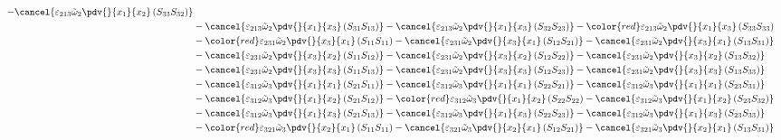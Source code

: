\begin{equation}
\begin{split}
		-\cancel{\varepsilon_{213}\tilde{\omega}_{2}\pdv{}{x_{1}}{x_{2}}\left(S_{33}S_{32}\right)}\\
&		-\cancel{\varepsilon_{213}\tilde{\omega}_{2}\pdv{}{x_{1}}{x_{3}}\left(S_{31}S_{13}\right)}
		-\cancel{\varepsilon_{213}\tilde{\omega}_{2}\pdv{}{x_{1}}{x_{3}}\left(S_{32}S_{23}\right)}
		-{\color{red}\varepsilon_{213}\tilde{\omega}_{2}\pdv{}{x_{1}}{x_{3}}\left(S_{33}S_{33}\right)}\\
&		-{\color{red}\varepsilon_{231}\tilde{\omega}_{2}\pdv{}{x_{3}}{x_{1}}\left(S_{11}S_{11}\right)}
		-\cancel{\varepsilon_{231}\tilde{\omega}_{2}\pdv{}{x_{3}}{x_{1}}\left(S_{12}S_{21}\right)}
		-\cancel{\varepsilon_{231}\tilde{\omega}_{2}\pdv{}{x_{3}}{x_{1}}\left(S_{13}S_{31}\right)}\\
&		-\cancel{\varepsilon_{231}\tilde{\omega}_{2}\pdv{}{x_{3}}{x_{2}}\left(S_{11}S_{12}\right)}
		-\cancel{\varepsilon_{231}\tilde{\omega}_{2}\pdv{}{x_{3}}{x_{2}}\left(S_{12}S_{22}\right)}
		-\cancel{\varepsilon_{231}\tilde{\omega}_{2}\pdv{}{x_{3}}{x_{2}}\left(S_{13}S_{32}\right)}\\
&		-\cancel{\varepsilon_{231}\tilde{\omega}_{2}\pdv{}{x_{3}}{x_{3}}\left(S_{11}S_{13}\right)}
		-\cancel{\varepsilon_{231}\tilde{\omega}_{2}\pdv{}{x_{3}}{x_{3}}\left(S_{12}S_{23}\right)}
		-\cancel{\varepsilon_{231}\tilde{\omega}_{2}\pdv{}{x_{3}}{x_{3}}\left(S_{13}S_{33}\right)}\\
&		-\cancel{\varepsilon_{312}\tilde{\omega}_{3}\pdv{}{x_{1}}{x_{1}}\left(S_{21}S_{11}\right)}
		-\cancel{\varepsilon_{312}\tilde{\omega}_{3}\pdv{}{x_{1}}{x_{1}}\left(S_{22}S_{21}\right)}
		-\cancel{\varepsilon_{312}\tilde{\omega}_{3}\pdv{}{x_{1}}{x_{1}}\left(S_{23}S_{31}\right)}\\
&		-\cancel{\varepsilon_{312}\tilde{\omega}_{3}\pdv{}{x_{1}}{x_{2}}\left(S_{21}S_{12}\right)}
		-{\color{red}\varepsilon_{312}\tilde{\omega}_{3}\pdv{}{x_{1}}{x_{2}}\left(S_{22}S_{22}\right)}
		-\cancel{\varepsilon_{312}\tilde{\omega}_{3}\pdv{}{x_{1}}{x_{2}}\left(S_{23}S_{32}\right)}\\
&		-\cancel{\varepsilon_{312}\tilde{\omega}_{3}\pdv{}{x_{1}}{x_{3}}\left(S_{21}S_{13}\right)}
		-\cancel{\varepsilon_{312}\tilde{\omega}_{3}\pdv{}{x_{1}}{x_{3}}\left(S_{22}S_{23}\right)}
		-\cancel{\varepsilon_{312}\tilde{\omega}_{3}\pdv{}{x_{1}}{x_{3}}\left(S_{23}S_{33}\right)}\\
&		-{\color{red}\varepsilon_{321}\tilde{\omega}_{3}\pdv{}{x_{2}}{x_{1}}\left(S_{11}S_{11}\right)}
		-\cancel{\varepsilon_{321}\tilde{\omega}_{3}\pdv{}{x_{2}}{x_{1}}\left(S_{12}S_{21}\right)}
		-\cancel{\varepsilon_{321}\tilde{\omega}_{3}\pdv{}{x_{2}}{x_{1}}\left(S_{13}S_{31}\right)}\\

\end{split}
\end{equation}
